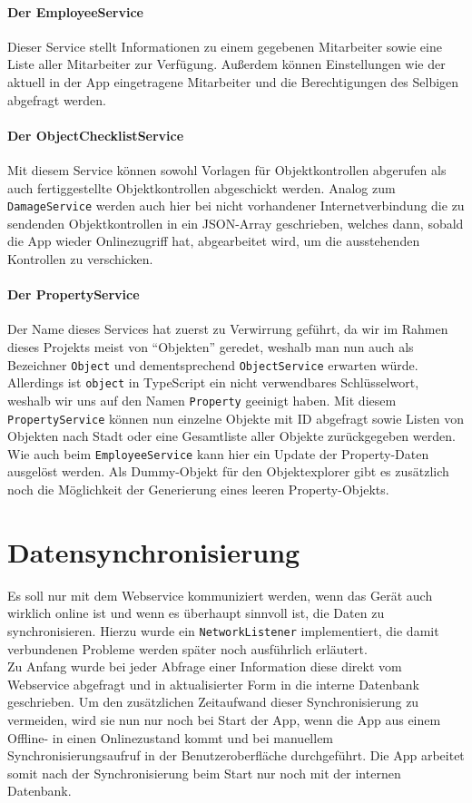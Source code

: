 \documentclass[12pt]{article}
\begin{document}
\paragraph{Der EmployeeService} Dieser Service stellt Informationen zu einem gegebenen Mitarbeiter sowie eine Liste aller Mitarbeiter zur Verfügung. Außerdem können Einstellungen wie der aktuell in der App eingetragene Mitarbeiter und die Berechtigungen des Selbigen abgefragt werden.
\paragraph{Der ObjectChecklistService} Mit diesem Service können sowohl Vorlagen für Objektkontrollen abgerufen als auch fertiggestellte Objektkontrollen abgeschickt werden. Analog zum \texttt{DamageService} werden auch hier bei nicht vorhandener Internetverbindung die zu sendenden Objektkontrollen in ein JSON-Array geschrieben, welches dann, sobald die App wieder Onlinezugriff hat, abgearbeitet wird, um die ausstehenden Kontrollen zu verschicken.
\paragraph{Der PropertyService} Der Name dieses Services hat zuerst zu Verwirrung geführt, da wir im Rahmen dieses Projekts meist von ``Objekten'' geredet, weshalb man nun auch als Bezeichner \texttt{Object} und dementsprechend \texttt{ObjectService} erwarten würde. Allerdings ist \texttt{object} in TypeScript ein nicht verwendbares Schlüsselwort, weshalb wir uns auf den Namen \texttt{Property} geeinigt haben. Mit diesem \texttt{PropertyService} können nun einzelne Objekte mit ID abgefragt sowie Listen von Objekten nach Stadt oder eine Gesamtliste aller Objekte zurückgegeben werden. Wie auch beim \texttt{EmployeeService} kann hier ein Update der Property-Daten ausgelöst werden. Als Dummy-Objekt für den Objektexplorer gibt es zusätzlich noch die Möglichkeit der Generierung eines leeren Property-Objekts.

\section{Datensynchronisierung}
Es soll nur mit dem Webservice kommuniziert werden, wenn das Gerät auch wirklich online ist und wenn es überhaupt sinnvoll ist, die Daten zu synchronisieren. Hierzu wurde ein \texttt{NetworkListener} implementiert, die damit verbundenen Probleme werden später noch ausführlich erläutert.\\
Zu Anfang wurde bei jeder Abfrage einer Information diese direkt vom Webservice abgefragt und in aktualisierter Form in die interne Datenbank geschrieben. Um den zusätzlichen Zeitaufwand dieser Synchronisierung zu vermeiden, wird sie nun nur noch bei Start der App, wenn die App aus einem Offline- in einen Onlinezustand kommt und bei manuellem Synchronisierungsaufruf in der Benutzeroberfläche durchgeführt. Die App arbeitet somit nach der Synchronisierung beim Start nur noch mit der internen Datenbank.
\end{document}
